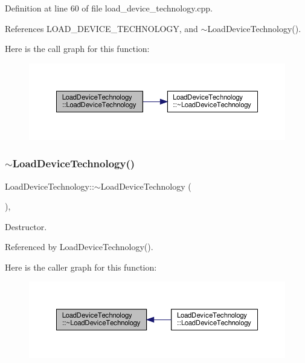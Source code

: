 Definition at line 60 of file load\+\_\+device\+\_\+technology.\+cpp.



References L\+O\+A\+D\+\_\+\+D\+E\+V\+I\+C\+E\+\_\+\+T\+E\+C\+H\+N\+O\+L\+O\+GY, and $\sim$\+Load\+Device\+Technology().

Here is the call graph for this function\+:
\nopagebreak
\begin{figure}[H]
\begin{center}
\leavevmode
\includegraphics[width=350pt]{d3/d84/classLoadDeviceTechnology_aa2de30a709666b525e0e75039874c30f_cgraph}
\end{center}
\end{figure}
\mbox{\label{classLoadDeviceTechnology_a982c1203a8d4be1f1e850d1efda27793}} 
\subsubsection{\texorpdfstring{$\sim$\+Load\+Device\+Technology()}{~LoadDeviceTechnology()}}
{\footnotesize\ttfamily Load\+Device\+Technology\+::$\sim$\+Load\+Device\+Technology (\begin{DoxyParamCaption}{ }\end{DoxyParamCaption})\hspace{0.3cm}{\ttfamily [override]}, {\ttfamily [default]}}



Destructor. 



Referenced by Load\+Device\+Technology().

Here is the caller graph for this function\+:
\nopagebreak
\begin{figure}[H]
\begin{center}
\leavevmode
\includegraphics[width=350pt]{d3/d84/classLoadDeviceTechnology_a982c1203a8d4be1f1e850d1efda27793_icgraph}
\end{center}
\end{figure}


